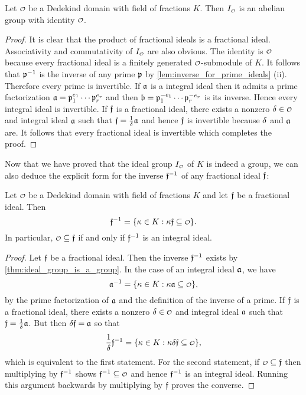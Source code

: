     \begin{theorem}\label{thm:ideal_group_is_a_group}
      Let $\smc{O}$ be a Dedekind domain with field of fractions $K$. Then $I_{\smc{O}}$ is an abelian group with identity $\smc{O}$.
    \end{theorem}
    \begin{proof}
      It is clear that the product of fractional ideals is a fractional ideal. Associativity and commutativity of $I_{\smc{O}}$ are also obvious. The identity is $\smc{O}$ because every fractional ideal is a finitely generated $\smc{O}$-submodule of $K$. It follows that $\mathfrak{p}^{-1}$ is the inverse of any prime $\mathfrak{p}$ by \cref{lem:inverse_for_prime_ideals} (ii). Therefore every prime is invertible. If $\mathfrak{a}$ is a integral ideal then it admits a prime factorization $\mathfrak{a} = \mathfrak{p}_{1}^{e_{1}} \cdots \mathfrak{p}_{r}^{e_{r}}$ and then $\mathfrak{b} = \mathfrak{p}_{1}^{-e_{1}} \cdots \mathfrak{p}_{r}^{-e_{r}}$ is its inverse. Hence every integral ideal is invertible. If $\mathfrak{f}$ is a fractional ideal, there exists a nonzero $\d \in \smc{O}$ and integral ideal $\mathfrak{a}$ such that $\mathfrak{f} = \frac{1}{\delta}\mathfrak{a}$ and hence $\mathfrak{f}$ is invertible because $\delta$ and $\mathfrak{a}$ are. It follows that every fractional ideal is invertible which completes the proof.
    \end{proof}

    Now that we have proved that the ideal group $I_{\smc{O}}$ of $K$ is indeed a group, we can also deduce the explicit form for the inverse $\mathfrak{f}^{-1}$ of any fractional ideal $\mathfrak{f}$:

    \begin{proposition}\label{prop:explicit_inverse_ideal}
      Let $\smc{O}$ be a Dedekind domain with field of fractions $K$ and let $\mathfrak{f}$ be a fractional ideal. Then
      \[
        \mf{f}^{-1} = \{\k \in K:\k\mf{f} \subseteq \smc{O}\}.
      \]
      In particular, $\smc{O} \subseteq \mf{f}$ if and only if $\mathfrak{f}^{-1}$ is an integral ideal.
    \end{proposition}
    \begin{proof}
      Let $\mathfrak{f}$ be a fractional ideal. Then the inverse $\mathfrak{f}^{-1}$ exists by \cref{thm:ideal_group_is_a_group}. In the case of an integral ideal $\mathfrak{a}$, we have
      \[
        \mf{a}^{-1} = \{\k \in K:\k\mf{a} \subseteq \smc{O}\},
      \]
      by the prime factorization of $\mathfrak{a}$ and the definition of the inverse of a prime. If $\mathfrak{f}$ is a fractional ideal, there exists a nonzero $\d \in \smc{O}$ and integral ideal $\mathfrak{a}$ such that $\mathfrak{f} = \frac{1}{\delta}\mathfrak{a}$. But then $\delta\mathfrak{f} = \mathfrak{a}$ so that
      \[
        \frac{1}{\d}\mf{f}^{-1} = \{\k \in K:\k\d\mf{f} \subseteq \smc{O}\},
      \]
      which is equivalent to the first statement. For the second statement, if $\smc{O} \subseteq \mf{f}$ then multiplying by $\mathfrak{f}^{-1}$ shows $\mf{f}^{-1} \subseteq \smc{O}$ and hence $\mathfrak{f}^{-1}$ is an integral ideal. Running this argument backwards by multiplying by $\mathfrak{f}$ proves the converse.
    \end{proof}

